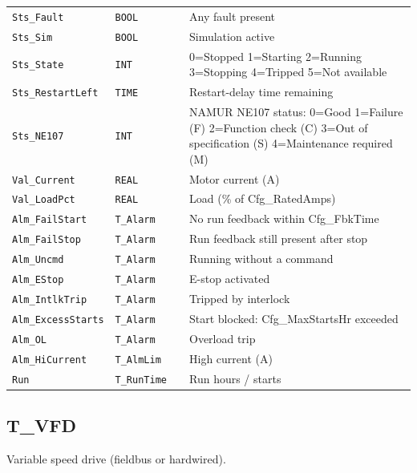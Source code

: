 \begin{small}
\begin{longtable}{@{}P{3.70cm}P{2.20cm}P{1.70cm}P{8.91cm}@{}}
\texttt{Sts\_Fault} & \texttt{BOOL} &  & Any fault present \\
\texttt{Sts\_Sim} & \texttt{BOOL} &  & Simulation active \\
\texttt{Sts\_State} & \texttt{INT} &  & 0=Stopped 1=Starting 2=Running 3=Stopping 4=Tripped 5=Not available \\
\texttt{Sts\_RestartLeft} & \texttt{TIME} &  & Restart-delay time remaining \\
\texttt{Sts\_NE107} & \texttt{INT} &  & NAMUR NE107 status: 0=Good 1=Failure (F) 2=Function check (C) 3=Out of specification (S) 4=Maintenance required (M) \\
\texttt{Val\_Current} & \texttt{REAL} &  & Motor current (A) \\
\texttt{Val\_LoadPct} & \texttt{REAL} &  & Load (\% of Cfg\_RatedAmps) \\
\texttt{Alm\_FailStart} & \texttt{T\_Alarm} &  & No run feedback within Cfg\_FbkTime \\
\texttt{Alm\_FailStop} & \texttt{T\_Alarm} &  & Run feedback still present after stop \\
\texttt{Alm\_Uncmd} & \texttt{T\_Alarm} &  & Running without a command \\
\texttt{Alm\_EStop} & \texttt{T\_Alarm} &  & E-stop activated \\
\texttt{Alm\_IntlkTrip} & \texttt{T\_Alarm} &  & Tripped by interlock \\
\texttt{Alm\_ExcessStarts} & \texttt{T\_Alarm} &  & Start blocked: Cfg\_MaxStartsHr exceeded \\
\texttt{Alm\_OL} & \texttt{T\_Alarm} &  & Overload trip \\
\texttt{Alm\_HiCurrent} & \texttt{T\_AlmLim} &  & High current (A) \\
\texttt{Run} & \texttt{T\_RunTime} &  & Run hours /\allowbreak{} starts \\
\bottomrule
\end{longtable}
\end{small}

\subsection{T\_VFD}\label{sec:pclib-t-vfd}

Variable speed drive (fieldbus or hardwired).

\par{}\par

